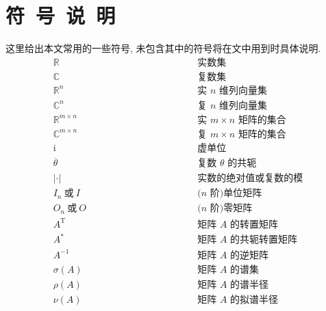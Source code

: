 \chapter*{符~号~说~明}
\headheight=15.24pt%
这里给出本文常用的一些符号, 未包含其中的符号将在文中用到时具体说明.
\begin{equation*}
  \begin{array}{lll}
\mathbb{R}&\qquad\qquad\qquad\qquad\qquad&\text{实数集}\\
\mathbb{C}&&\text{复数集}\\
\mathbb{R}^{n} &&\text{实~$n$ 维列向量集} \\
\mathbb{C}^{n} &&\text{复~$n$ 维列向量集} \\
\mathbb{R}^{m\times n} && \text{实~$m\times n$ 矩阵的集合} \\
\mathbb{C}^{m\times n} && \text{复~$m\times n$ 矩阵的集合} \\
\mathrm{i}&&\text{虚单位}\\
\overline{\theta} && \text{复数~$\theta$~的共轭}\\
|\cdot| &&\text{实数的绝对值或复数的模}\\
I_n~\text{或}~I &&\text{($n$~阶)单位矩阵}\\
O_n~\text{或}~O &&\text{($n$~阶)零矩阵}\\
A^\mathrm{T} &&\text{矩阵~$A$~的转置矩阵}\\
A^* &&\text{矩阵~$A$~的共轭转置矩阵}\\
A^{-1}&&  \text{矩阵~$A$~的逆矩阵}\\
\sigma(A)&&\text{矩阵~$A$~的谱集}\\
\rho(A) &&\text{矩阵~$A$~的谱半径}\\
\nu(A) &&\text{矩阵~$A$~的拟谱半径}\\

\end{array}
\end{equation*}
